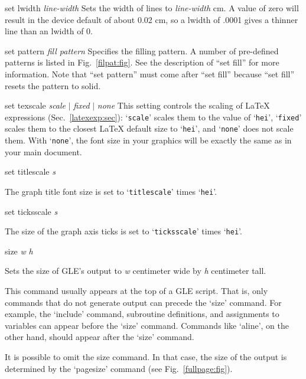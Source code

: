 \begin{commanddescription}
\item[{\sf set lwidth {\it line-width}}]
Sets the width of lines to {\it line-width} cm.  A value of zero will result in
the device default of about 0.02 cm, so a lwidth of .0001 gives
a thinner line than an lwidth of 0.

\item[{\sf set pattern {\it fill pattern}}]
Specifies the filling pattern. A number of pre-defined patterns is listed in Fig.~\ref{filpat:fig}. See the description of ``set fill'' for more information. Note that ``set pattern'' must come after ``set fill'' because ``set fill'' resets the pattern to solid.

\item[{\sf set texscale {\it scale} $|$ {\it fixed} $|$ {\it none}}]
This setting controls the scaling of \LaTeX{} expressions (Sec.~\ref{latexexp:sec}): `\texttt{scale}' scales them to the value of `\texttt{hei}', `\texttt{fixed}' scales them to the closest \LaTeX{} default size to `\texttt{hei}', and `\texttt{none}' does not scale them. With `\texttt{none}', the font size in your graphics will be exactly the same as in your main document.

\item[{\sf set titlescale {\it s}}]

The graph title font size is set to `\texttt{titlescale}' times `\texttt{hei}'.

\item[{\sf set ticksscale {\it s}}]

The size of the graph axis ticks is set to `\texttt{ticksscale}' times `\texttt{hei}'.

\item[{\sf size {\it w} {\it h}}]

Sets the size of GLE's output to {\it w} centimeter wide by {\it h} centimeter tall.

This command usually appears at the top of a GLE script. That is, only commands that do not generate output can precede the `size' command. For example, the `include' command, subroutine definitions, and assignments to variables can appear before the `size' command. Commands like `aline', on the other hand, should appear after the `size' command.

It is possible to omit the size command. In that case, the size of the output is determined by the `pagesize' command (see Fig.~\ref{fullpage:fig}).


\end{commanddescription}
